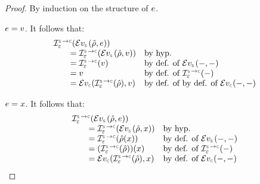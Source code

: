 \begin{proof}
By induction on the structure of  $e$. 
\vspace{5pt}

\noindent {} $e = v$. It follows that: 
$$
\begin{array}{ll}
  \interpret{\symbconc}{\senv}(\evalexpr{\symbolic}(\sstore, \jsilexpr))  & \\ 
      \qquad  =  \interpret{\symbconc}{\senv}(\evalexpr{\symbolic}(\sstore, \val)) & \text{by hyp.} \\  
      \qquad =  \interpret{\symbconc}{\senv}(\val)  & \text{by def. of } \evalexpr{\symbolic}(-, -) \\ 
      \qquad = \val  & \text{by def. of } \interpret{\symbconc}{\senv}(-) \\ 
      \qquad = \evalexpr{\concrete}(\interpret{\symbconc}{\senv}(\sstore), \val)  & \text{by def. of }  \text{by def. of } \evalexpr{\concrete}(-, -)
\end{array}
$$
\vspace{3pt}

\noindent {} $e = x$. It follows that: 
$$
\begin{array}{ll}
  \interpret{\symbconc}{\senv}(\evalexpr{\symbolic}(\sstore, \jsilexpr))  & \\
       \qquad =  \interpret{\symbconc}{\senv}(\evalexpr{\symbolic}(\sstore, \jvar)) & \text{by hyp.} \\  
        \qquad =  \interpret{\symbconc}{\senv}(\sstore(\jvar))  & \text{by def. of } \evalexpr{\symbolic}(-, -) \\ 
       \qquad =  (\interpret{\symbconc}{\senv}(\sstore))(\jvar)   & \text{by def. of } \interpret{\symbconc}{\senv}(-) \\ 
      \qquad = \evalexpr{\concrete}(\interpret{\symbconc}{\senv}(\sstore), \jvar)  &  \text{by def. of } \evalexpr{\concrete}(-, -)
\end{array}
$$
\vspace{3pt}


\end{proof}
